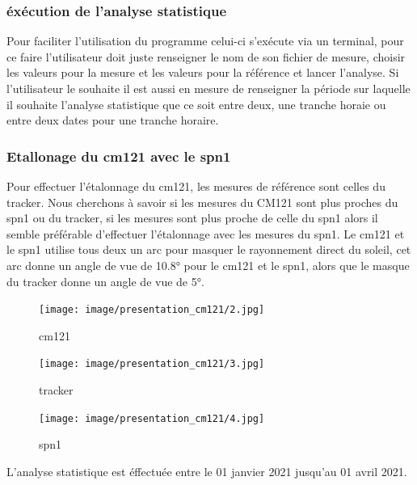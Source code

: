 \documentclass[12pt,a4paper]{article}
\begin{document}
\begin{flushleft}
\subsubsection{éxécution de l'analyse statistique}

Pour faciliter l'utilisation du programme celui-ci s'exécute via un terminal, pour ce faire l'utilisateur doit juste renseigner le nom de son fichier de mesure, choisir les valeurs pour la mesure et les valeurs pour la référence et lancer l'analyse. Si l'utilisateur le souhaite il est aussi en mesure de renseigner la période sur laquelle il souhaite l'analyse statistique que ce soit entre deux, une tranche horaie ou entre deux dates pour une tranche horaire.


\subsubsection{Etallonage du cm121 avec le spn1}

Pour effectuer l'étalonnage du cm121, les mesures de référence sont celles du tracker. Nous cherchons à savoir si les mesures du CM121 sont plus proches du spn1 ou du tracker, si les mesures sont plus proche de celle du spn1 alors il semble préférable d'effectuer l'étalonnage avec les mesures du spn1. Le cm121 et le spn1 utilise tous deux un arc pour masquer le rayonnement direct du soleil, cet arc donne un angle de vue de 10.8° pour le cm121 et le spn1, alors que le masque du tracker donne un angle de vue de 5°.\\

\begin{figure}[H]
    \begin{minipage}[c]{.2\linewidth}
        \centering
        \texttt{[image: image/presentation\_cm121/2.jpg]}  
        \caption{cm121}
    \end{minipage}
    \hfill%
    \begin{minipage}[c]{.2\linewidth}
        \centering
        \texttt{[image: image/presentation\_cm121/3.jpg]}  
        \caption{tracker}
    \end{minipage}
    \hfill%
    \begin{minipage}[c]{.3\linewidth}
        \centering
        \texttt{[image: image/presentation\_cm121/4.jpg]} 
        \caption{spn1}
    \end{minipage}
\end{figure}

L'analyse statistique est éffectuée entre le 01 janvier 2021 jusqu'au 01 avril 2021.


\end{flushleft}
\end{document}
